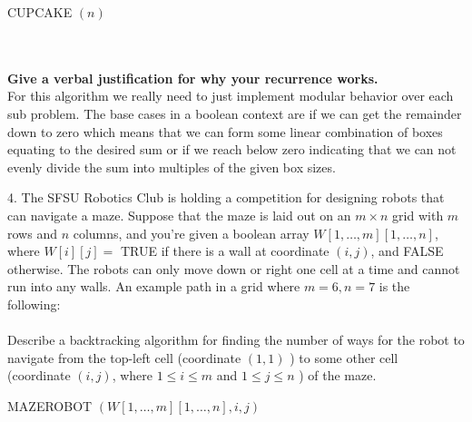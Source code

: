 \documentclass[11pt]{article}
\theoremstyle{definition}  %
\newcommand{\block}[2]{\begin{tcolorbox}[title={#1}]{#2}\end{tcolorbox}}
\begin{document}
\begin{algorithm}
    \caption{CUPCAKE $(n)$ }
    \label{alg:algorithm_sum}
    \begin{algorithmic}[1]


      \EndIf


      \Else


    \end{algorithmic}
  \end{algorithm}\\\\
\textbf{Give a verbal justification for why your recurrence works.}\\
For this algorithm we really need to just implement modular behavior over each sub problem. The base cases in a boolean context are if we can get the remainder down to zero which means that we can form some linear combination of boxes equating to the desired sum or if we reach below zero indicating that we can not evenly divide the sum into multiples of the given box sizes.
\pagebreak
\block{Question 4}{
4. The SFSU Robotics Club is holding a competition for designing robots that can navigate a maze. Suppose that the maze is laid out on an $m \times n$ grid with $m$ rows and $n$ columns, and you're given a boolean array $W[1, \ldots, m][1, \ldots, n]$, where $W[i][j]=$ TRUE if there is a wall at coordinate $(i, j)$, and FALSE otherwise. The robots can only move down or right one cell at a time and cannot run into any walls. An example path in a grid where $m=6, n=7$ is the following:\\\\
Describe a backtracking algorithm for finding the number of ways for the robot to navigate from the top-left cell (coordinate $(1,1)$ ) to some other cell (coordinate $(i, j)$, where $1 \leq i \leq m$ and $1 \leq j \leq n$ ) of the maze. }
\begin{algorithm}
    \caption{MAZEROBOT $(W[1, \ldots, m][1, \ldots, n], i, j)$  }
    \label{alg:algorithm_sum}
    \begin{algorithmic}[1]
      \EndIf
      \EndIf
      \EndIf
    \end{algorithmic}
  \end{algorithm}
\end{document}
